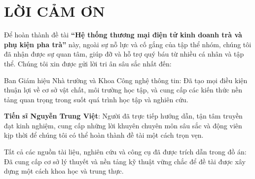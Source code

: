 \chapter*{LỜI CẢM ƠN}

Để hoàn thành đề tài \textbf{“Hệ thống thương mại điện tử kinh doanh trà và phụ kiện pha trà”} này, ngoài sự nỗ lực và cố gắng của tập thể nhóm, chúng tôi đã nhận được sự quan tâm, giúp đỡ và hỗ trợ quý báu từ nhiều cá nhân và tập thể. Chúng tôi xin được gửi lời tri ân sâu sắc nhất đến:

Ban Giám hiệu Nhà trường và Khoa Công nghệ thông tin: Đã tạo mọi điều kiện thuận lợi về cơ sở vật chất, môi trường học tập, và cung cấp các kiến thức nền tảng quan trọng trong suốt quá trình học tập và nghiên cứu.

\textbf{Tiến sĩ Nguyễn Trung Việt}: Người đã trực tiếp hướng dẫn, tận tâm truyền đạt kinh nghiệm, cung cấp những lời khuyên chuyên môn sâu sắc và động viên kịp thời để chúng tôi có thể hoàn thành đề tài một cách trọn vẹn.

Tất cả các nguồn tài liệu, nghiên cứu và công cụ đã được trích dẫn trong đồ án: Đã cung cấp cơ sở lý thuyết và nền tảng kỹ thuật vững chắc để đề tài được xây dựng một cách khoa học và trung thực.
